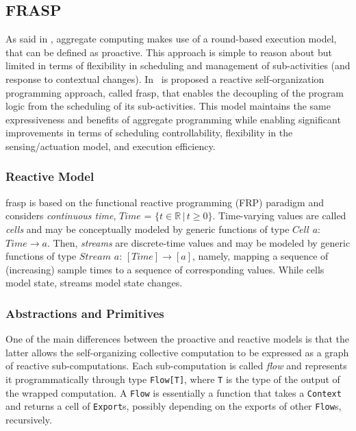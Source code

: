 \subsection{FRASP}
\label{section:frasp}

As said in , aggregate computing makes use of a round-based execution model, that can be defined as proactive. This approach is simple to reason about but limited in terms of flexibility in scheduling and management of sub-activities (and response to contextual changes). In~\cite{Casadei2023} is proposed a reactive self-organization programming approach, called \ac{frasp}, that enables the decoupling of the program logic from the scheduling of its sub-activities. This model maintains the same expressiveness and benefits of aggregate programming while enabling significant improvements in terms of scheduling controllability, flexibility in the sensing/actuation model, and execution efficiency.

\subsubsection{Reactive Model}
\label{subsubsection:reactive-model}
\ac{frasp} is based on the functional reactive programming (FRP) paradigm and considers \textit{continuous time}, $Time$ = $\{ t \in \mathbb{R} \, | \, t \geq 0 \}$. Time-varying values are called \textit{cells} and may be conceptually modeled by generic functions of type $Cell$ $a$: $Time \rightarrow a$. Then, \textit{streams} are discrete-time values and may be modeled by generic functions of type $Stream$ $a$: $[Time] \rightarrow [a]$, namely, mapping a sequence of (increasing) sample times to a sequence of corresponding values. While cells model state, streams model state changes.

\subsubsection{Abstractions and Primitives}
\label{subsubsection:abstractions-and-primitives}

One of the main differences between the proactive and reactive models is that the latter allows the self-organizing collective computation to be expressed as a graph of reactive sub-computations. Each sub-computation is called \textit{flow} and represents it programmatically through type \texttt{Flow[T]}, where \texttt{T} is the type of the output of the wrapped computation. A \texttt{Flow} is essentially a function that takes a \texttt{Context} and returns a cell of \texttt{Export}s, possibly depending on the exports of other \texttt{Flow}s, recursively.

